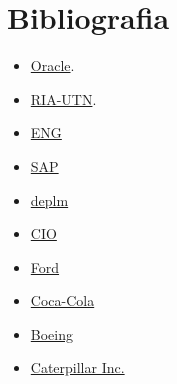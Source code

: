 \documentclass[12pt]{article}
\begin{document}
\clearpage

\section{Bibliografia}
\begin{itemize}
    \item \href{https://www.oracle.com/es/scm/product-lifecycle-management/what-is-plm/}{Oracle}.
    \item \href{efaidnbmnnnibpcajpcglclefindmkaj/https://ria.utn.edu.ar/bitstream/handle/20.500.12272/4420/SISTEMAS%20PLM.pdf?sequence=1&isAllowed=y}{RIA-UTN}.
    \item \href{https://www.indx.com/es/solution/product-lifecycle-management-plm-for-discrete-industry}{ENG}
    \item \href{https://www.sap.com/spain/products/scm/plm-r-d-engineering/what-is-product-lifecycle-management.html}{SAP}
    \item \href{https://deplm.com.ar/siemens-plm/diferencias-entre-plm-y-erp/}{deplm}
    \item \href{https://www.cio.com/article/2071332/los-15-mejores-proveedores-de-plm.html}{CIO}
    \item \href{https://es.ford.com/}{Ford}
    \item \href{https://www.coca-cola.com/es/es}{Coca-Cola}
    \item \href{https://www.boeing.es/}{Boeing}
    \item \href{https://www.caterpillar.com/es.html}{Caterpillar Inc.}

\end{itemize}
\end{document}
